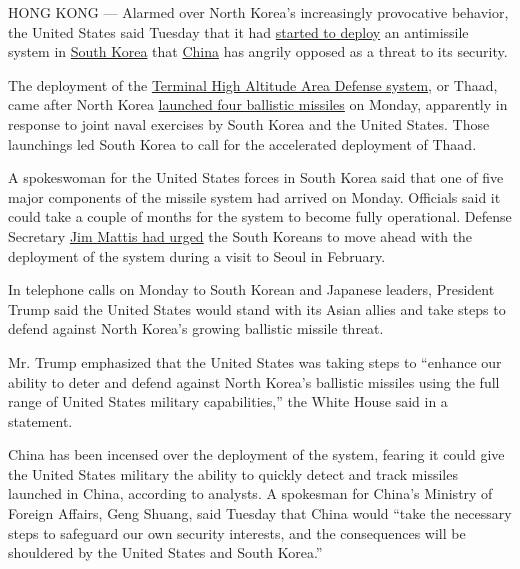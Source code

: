 HONG KONG --- Alarmed over North Korea's increasingly provocative
behavior, the United States said Tuesday that it had
\href{https://www.youtube.com/watch?v=BI68rmNQWXQ}{started to deploy} an
antimissile system in
\href{https://www.nytimes3xbfgragh.onion/topic/destination/south-korea?8qa}{South
Korea} that
\href{https://www.nytimes3xbfgragh.onion/topic/destination/china?inline=nyt-geo}{China}
has angrily opposed as a threat to its security.

The deployment of the
\href{http://www.lockheedmartin.com/us/products/thaad.html}{Terminal
High Altitude Area Defense system}, or Thaad, came after North Korea
\href{https://www.nytimes3xbfgragh.onion/2017/03/05/world/north-korea-ballistic-missiles.html?rref=collection\%2Ftimestopic\%2FSouth\%20Korea\&action=click\&contentCollection=world\&region=stream\&module=stream_unit\&version=latest\&contentPlacement=4\&pgtype=collection}{launched
four ballistic missiles} on Monday, apparently in response to joint
naval exercises by South Korea and the United States. Those launchings
led South Korea to call for the accelerated deployment of Thaad.

A spokeswoman for the United States forces in South Korea said that one
of five major components of the missile system had arrived on Monday.
Officials said it could take a couple of months for the system to become
fully operational. Defense Secretary
\href{https://www.nytimes3xbfgragh.onion/2017/02/02/world/asia/james-mattis-us-korea-thaad.html}{Jim
Mattis had urged} the South Koreans to move ahead with the deployment of
the system during a visit to Seoul in February.

In telephone calls on Monday to South Korean and Japanese leaders,
President Trump said the United States would stand with its Asian allies
and take steps to defend against North Korea's growing ballistic missile
threat.

Mr. Trump emphasized that the United States was taking steps to
``enhance our ability to deter and defend against North Korea's
ballistic missiles using the full range of United States military
capabilities,'' the White House said in a statement.

China has been incensed over the deployment of the system, fearing it
could give the United States military the ability to quickly detect and
track missiles launched in China, according to analysts. A spokesman for
China's Ministry of Foreign Affairs, Geng Shuang, said Tuesday that
China would ``take the necessary steps to safeguard our own security
interests, and the consequences will be shouldered by the United States
and South Korea.''

